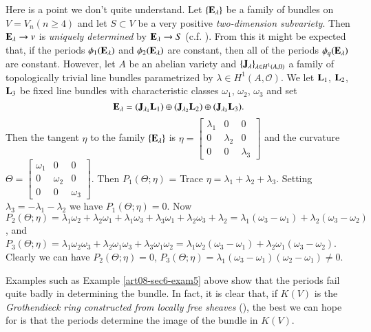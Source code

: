 \begin{example}\label{art08-sec6-exam5}
Here is a point we don't quite understand. Let $\{\mathbf{E}_{\lambda}\}$ be a family of bundles on $V=V_{n}(n\geq 4)$ and let $S\subset V$ be a very positive {\em two-dimension subvariety}. Then $\mathbf{E}_{\lambda}\to v$ is {\em uniquely determined} by $\mathbf{E}_{\lambda}\to S$ (c.f. \cite{art08-key8}). From this it might be expected that, if the periods $\phi_{1}(\mathbf{E}_{\lambda})$ and $\phi_{2}(\mathbf{E}_{\lambda})$ are constant, then all of the periods $\phi_{q}(\mathbf{E}_{\lambda})$ are constant. However, let $A$ be an abelian variety and $\{\mathbf{J}_{\lambda}\}_{\lambda\in H^{1}(A,0)}$ a family of topologically trivial line bundles parametrized by $\lambda\in H^{1}(A,\mathcal{O})$. We let $\mathbf{L}_{1}$, $\mathbf{L}_{2}$, $\mathbf{L}_{3}$ be fixed line bundles with characteristic classes $\omega_{1}$, $\omega_{2}$, $\omega_{3}$ and set
$$
\mathbf{E}_{\lambda}=(\mathbf{J}_{\lambda_{1}}\mathbf{L}_{1})\oplus (\mathbf{J}_{\lambda_{2}}\mathbf{L}_{2})\oplus (\mathbf{J}_{\lambda_{3}}\mathbf{L}_{3}).
$$
Then the tangent $\eta$ to the family $\{\mathbf{E}_{\lambda}\}$ is $\eta=\left[\begin{matrix} \lambda_{1} & 0 & 0\\ 0 & \lambda_{2} & 0\\ 0 & 0 & \lambda_{3}\end{matrix}\right]$ and the curvature $\Theta=\left[\begin{matrix} \omega_{1} & 0 & 0\\ 0 & \omega_{2} & 0\\ 0 & 0 & \omega_{3}\end{matrix}\right]$. Then $P_{1}(\Theta;\eta)$ = Trace $\eta=\lambda_{1}+\lambda_{2}+\lambda_{3}$. Setting $\lambda_{3}=-\lambda_{1}-\lambda_{2}$ we have $P_{1}(\Theta;\eta)=0$. Now $P_{2}(\Theta;\eta)=\lambda_{1}\omega_{2}+\lambda_{2}\omega_{1}+\lambda_{1}\omega_{3}+\lambda_{3}\omega_{1}+\lambda_{2}\omega_{3}+\lambda_{2}=\lambda_{1}(\omega_{3}-\omega_{1})+\lambda_{2}(\omega_{3}-\omega_{2})$, and $P_{3}(\Theta;\eta)=\lambda_{1}\omega_{2}\omega_{3}+\lambda_{2}\omega_{1}\omega_{3}+\lambda_{3}\omega_{1}\omega_{2}=\lambda_{1}\omega_{2}(\omega_{3}-\omega_{1})+\lambda_{2}\omega_{1}(\omega_{3}-\omega_{2})$. Clearly we can have $P_{2}(\Theta;\eta)=0$, $P_{3}(\Theta;\eta)=\lambda_{1}(\omega_{3}-\omega_{1})(\omega_{2}-\omega_{1})\neq 0$.
\end{example}

\begin{example}\label{art08-sec6-exam6}
Examples such as Example \ref{art08-sec6-exam5} above show that the periods fail quite badly in determining the bundle. In fact, it is clear that, if $K(V)$ is the {\em Grothendieck ring constructed from locally free sheaves} (\cite{art08-key12}), the best we can hope for is that the periods determine the image of the bundle in $K(V)$.
\end{example}


